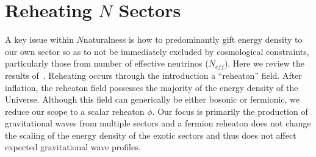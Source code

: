 \documentclass[nofootinbib,twocolumn,preprintnumbers]{revtex4-1}
\begin{document}
\section{Reheating $N$ Sectors}
\label{sec:reheat}
A key issue within $N$naturalness is how to predominantly gift energy density to our own sector so as to not be immediately excluded by cosmological constraints, particularly those from number of effective neutrinos ($N_{eff}$). Here we review the results of~\cite{Arkani-Hamed:2016rle}. Reheating occurs through the introduction a ``reheaton'' field. After inflation, the reheaton field possesses the majority of the energy density of the Universe. Although this field can generically be either bosonic or fermionic, we reduce our scope to a scalar reheaton $\phi$. Our focus is primarily the production of gravitational waves from multiple sectors and a fermion reheaton does not change the scaling of the energy density of the exotic sectors and thus does not affect expected gravitational wave profiles.
\end{document}
